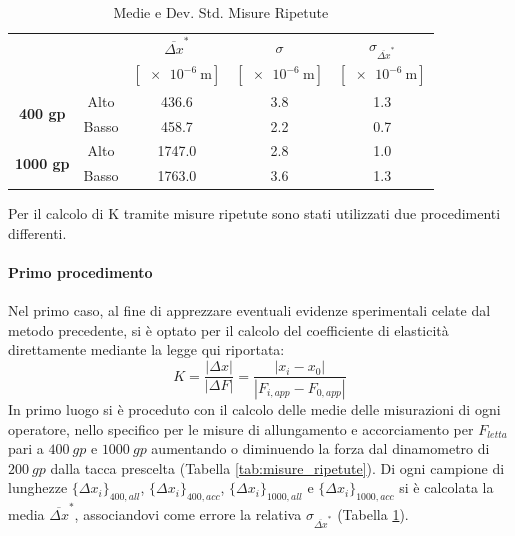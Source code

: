 \documentclass[a4paper,11pt,oneside]{article}
\begin{document}
\begin{table}[h!]
    \centering
    \begin{tabular}{|c|c|c|c|c|}
        \hline
          \multicolumn{2}{|c|}{\multirow{2}{*}{}} & ${\overline{\Delta x}}^\ast$& $\sigma$ & $\sigma_{{\overline{\Delta x}}^\ast}$\\
          \multicolumn{2}{|c|}{} & $[\SI{e-6}{\meter}]$ & $[\SI{e-6}{\meter}]$ & $[\SI{e-6}{\meter}]$\\ 
          \hline
          \multirow{2}{*}{\textbf{400 gp}}& {\cellcolor[rgb]{0.85,0.85,0.85}}Alto & {\cellcolor[rgb]{0.85,0.85,0.85}}436.6&	{\cellcolor[rgb]{0.85,0.85,0.85}}3.8&	{\cellcolor[rgb]{0.85,0.85,0.85}}1.3\\ \cline{2-5}
          &Basso&   458.7&	2.2&	0.7\\
          \hline
          \multirow{2}{*}{\textbf{1000 gp}}& {\cellcolor[rgb]{0.85,0.85,0.85}}Alto & {\cellcolor[rgb]{0.85,0.85,0.85}}1747.0&	{\cellcolor[rgb]{0.85,0.85,0.85}}2.8&	{\cellcolor[rgb]{0.85,0.85,0.85}}1.0\\ \cline{2-5}
          &Basso&   1763.0&	3.6&	1.3\\
         \hline
    \end{tabular}
    \caption{Medie e Dev. Std. Misure Ripetute}
    \label{tab:medie_misure_ripetute}
\end{table}{}

Per il calcolo di K tramite misure ripetute sono stati utilizzati due procedimenti differenti.\\
\paragraph{Primo procedimento}
Nel primo caso, al fine di apprezzare eventuali evidenze sperimentali celate dal metodo precedente, si è optato per il calcolo del coefficiente di elasticità direttamente mediante la legge qui riportata:\\%
\begin{equation*}
    K=\frac{\left | \Delta x \right |}{\left | \Delta F \right |}=\frac{\left | x_{i}-x_{0} \right |}{\left | F_{i, app}- F_{0, app} \right |}
\end{equation*}
In primo luogo si è proceduto con il calcolo delle medie delle misurazioni di ogni operatore, nello specifico per le misure di allungamento e accorciamento per $F_{letta}$ pari a $\SI{400}{gp}$ e $\SI{1000}{gp}$ aumentando o diminuendo la forza dal dinamometro di $\SI{200}{gp}$ dalla tacca prescelta (Tabella \ref{tab:misure_ripetute}). Di ogni campione di lunghezze $\{ {\Delta x}_i \}_{400, all}$, $\{ {\Delta x}_i \}_{400, acc}$, $\{ {\Delta x}_i \}_{1000, all}$ e $\{ {\Delta x}_i \}_{1000, acc}$ si è calcolata la media ${\overline{\Delta x}}^\ast$, associandovi come errore la relativa $\sigma_{\overline{\Delta x}^\ast}$ (Tabella \ref{tab:medie_misure_ripetute}).\\
\end{document}

